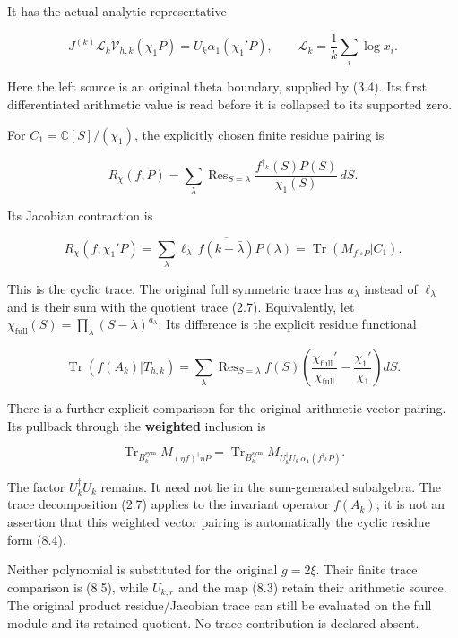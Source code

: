 \documentclass[
]{article}
\begin{document}
It has the actual analytic representative

\[J^{(k)}\mathscr L_k\mathcal V_{h,k}(\chi_1P)
=U_k\alpha_1(\chi_1'P),\qquad
\mathscr L_k=\frac1k\sum_i\log x_i.\tag{8.3}\]

Here the left source is an original theta boundary, supplied by (3.4).
Its first differentiated arithmetic value is read before it is collapsed
to its supported zero.

For \(C_1=\mathbb C[S]/(\chi_1)\), the explicitly chosen finite residue
pairing is

\[R_\chi(f,P)=\sum_\lambda\operatorname{Res}_{S=\lambda}
\frac{f^{\dagger_k}(S)P(S)}{\chi_1(S)}\,dS.\]

Its Jacobian contraction is

\[\boxed{R_\chi(f,\chi_1'P)
=\sum_\lambda \ell_\lambda\,\overline{f(k-\bar\lambda)}P(\lambda)
=\operatorname{Tr}(M_{f^{\dagger_k}P}|C_1).}\tag{8.4}\]

This is the cyclic trace. The original full symmetric trace has
\(a_\lambda\) instead of \(\ell_\lambda\) and is their sum with the
quotient trace (2.7). Equivalently, let
\(\chi_{\mathrm{full}}(S)=\prod_\lambda(S-\lambda)^{a_\lambda}\). Its
difference is the explicit residue functional

\[\boxed{\operatorname{Tr}(f(A_k)|T_{h,k})
=\sum_\lambda\operatorname{Res}_{S=\lambda}f(S)
\left(\frac{\chi_{\mathrm{full}}'}{\chi_{\mathrm{full}}}-
\frac{\chi_1'}{\chi_1}\right)dS.}\tag{8.5}\]

There is a further explicit comparison for the original arithmetic
vector pairing. Its pullback through the \textbf{weighted} inclusion is

\[\operatorname{Tr}_{B_k^{\mathrm{sym}}}M_{(\eta f)^\dagger\eta P}
=\operatorname{Tr}_{B_k^{\mathrm{sym}}}M_{U_k^\dagger U_k\,\alpha_1(f^{\dagger_k}P)}.\tag{8.6}\]

The factor \(U_k^\dagger U_k\) remains. It need not lie in the
sum-generated subalgebra. The trace decomposition (2.7) applies to the
invariant operator \(f(A_k)\); it is not an assertion that this weighted
vector pairing is automatically the cyclic residue form (8.4).

Neither polynomial is substituted for the original \(g=2\xi\). Their
finite trace comparison is (8.5), while \(U_{k,r}\) and the map (8.3)
retain their arithmetic source. The original product residue/Jacobian
trace can still be evaluated on the full module and its retained
quotient. No trace contribution is declared absent.
\end{document}

